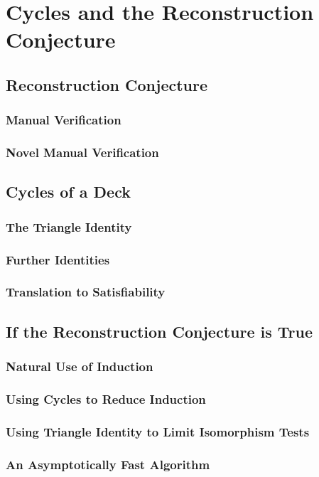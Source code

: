 \documentclass[11pt,a4paper]{report}
\begin{document}
\chapter{Cycles and the Reconstruction Conjecture}

\section{Reconstruction Conjecture}

\subsection{Manual Verification}
\subsection{Novel Manual Verification}

\section{Cycles of a Deck}
\subsection{The Triangle Identity}
\subsection{Further Identities}
\subsection{Translation to Satisfiability}

\section{If the Reconstruction Conjecture is True}
\subsection{Natural Use of Induction}
\subsection{Using Cycles to Reduce Induction}
\subsection{Using Triangle Identity to Limit Isomorphism Tests}
\subsection{An Asymptotically Fast Algorithm}
\end{document}
